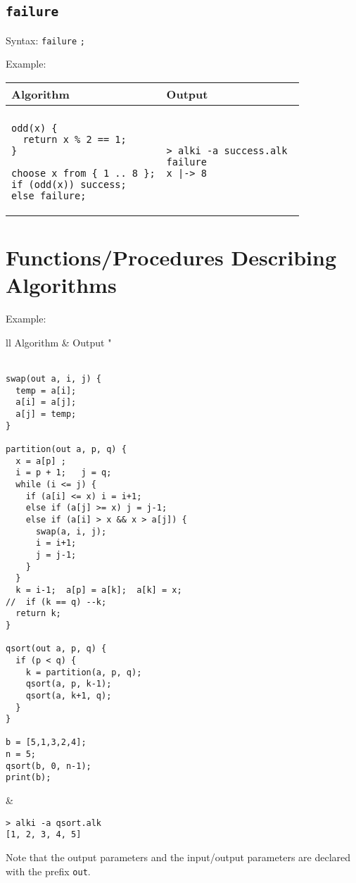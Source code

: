 \documentclass[a4paper]{report}
\begin{document}
\subsection{\texttt{failure}}

Syntax: \verb"failure" \verb";"

Example:
\begin{center}
\begin{tabular}{ll}
Algorithm & Output\\
\hline
\\
\begin{minipage}{.45\textwidth}
\begin{verbatim}
odd(x) {
  return x % 2 == 1;
}

choose x from { 1 .. 8 };
if (odd(x)) success;
else failure;
\end{verbatim}
\end{minipage}
&
\begin{minipage}{.45\textwidth}
\begin{verbatim}
> alki -a success.alk 
failure
x |-> 8
\end{verbatim}
\end{minipage}
\end{tabular}
\end{center}

\section{Functions/Procedures Describing Algorithms}

Example:
\begin{center}
\begin{tabular}{ll}
Algorithm & Output "\\
\hline
\\
\begin{minipage}{.55\textwidth}
\begin{verbatim}
swap(out a, i, j) {
  temp = a[i];
  a[i] = a[j];
  a[j] = temp;
}

partition(out a, p, q) {
  x = a[p] ; 
  i = p + 1;   j = q;
  while (i <= j) {
    if (a[i] <= x) i = i+1;
    else if (a[j] >= x) j = j-1;
    else if (a[i] > x && x > a[j]) {
      swap(a, i, j);
      i = i+1;
      j = j-1;
    }
  }
  k = i-1;  a[p] = a[k];  a[k] = x;
//  if (k == q) --k;
  return k;
}

qsort(out a, p, q) {
  if (p < q) {
    k = partition(a, p, q);
    qsort(a, p, k-1);
    qsort(a, k+1, q);
  }
}

b = [5,1,3,2,4];
n = 5;
qsort(b, 0, n-1);
print(b);
\end{verbatim}
\end{minipage}
&
\begin{minipage}{.42\textwidth}
\begin{verbatim}
> alki -a qsort.alk 
[1, 2, 3, 4, 5]
\end{verbatim}
\end{minipage}
\end{tabular}
\end{center}
Note that the output parameters and the input/output parameters are declared with the prefix {\tt out}.
\end{document}

